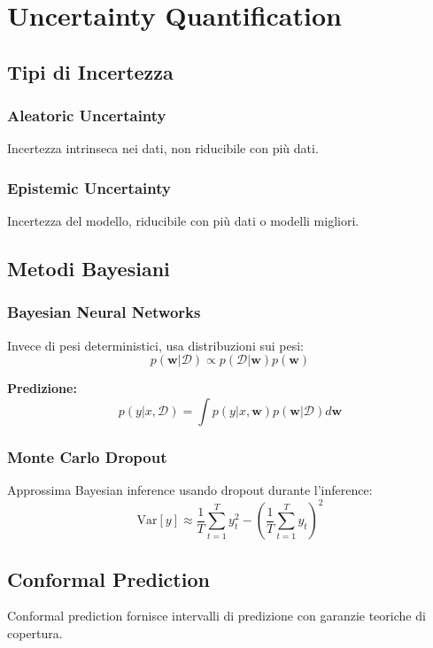 \documentclass[12pt,a4paper,twoside]{report}
\begin{document}
\section{Uncertainty Quantification}

\subsection{Tipi di Incertezza}

\subsubsection{Aleatoric Uncertainty}
Incertezza intrinseca nei dati, non riducibile con più dati.

\subsubsection{Epistemic Uncertainty}  
Incertezza del modello, riducibile con più dati o modelli migliori.

\subsection{Metodi Bayesiani}

\subsubsection{Bayesian Neural Networks}
Invece di pesi deterministici, usa distribuzioni sui pesi:
$$p(\mathbf{w}|\mathcal{D}) \propto p(\mathcal{D}|\mathbf{w}) p(\mathbf{w})$$

\textbf{Predizione:}
$$p(y|x, \mathcal{D}) = \int p(y|x, \mathbf{w}) p(\mathbf{w}|\mathcal{D}) d\mathbf{w}$$

\subsubsection{Monte Carlo Dropout}
Approssima Bayesian inference usando dropout durante l'inference:
$$\text{Var}[y] \approx \frac{1}{T} \sum_{t=1}^{T} y_t^2 - (\frac{1}{T} \sum_{t=1}^{T} y_t)^2$$

\subsection{Conformal Prediction}

Conformal prediction fornisce intervalli di predizione con garanzie teoriche di copertura.
\end{document}
